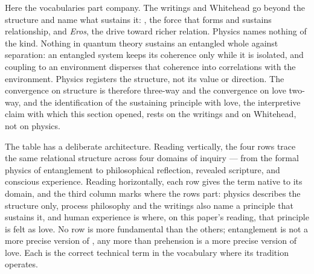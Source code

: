 Here the vocabularies part company.
The \bahai writings and Whitehead go beyond the structure and name what
sustains it: \mahabbat, the force that forms and sustains relationship,
and \emph{Eros}, the drive toward richer relation.
Physics names nothing of the kind.
Nothing in quantum theory sustains an entangled whole against separation:
an entangled system keeps its coherence only while it is isolated, and
coupling to an environment disperses that coherence into correlations
with the environment.
Physics registers the structure, not its value or direction.
The convergence on structure is therefore three-way and the convergence on
love two-way, and the identification of the sustaining principle with
love, the interpretive claim with which this section opened, rests on the
\bahai writings and on Whitehead, not on physics.

The table has a deliberate architecture.
Reading vertically, the four rows trace the same relational structure
across four domains of inquiry --- from the formal physics of
entanglement to philosophical reflection, revealed scripture, and
conscious experience.
Reading horizontally, each row gives the term native to its domain, and
the third column marks where the rows part: physics describes the
structure only, process philosophy and the \bahai writings also name a
principle that sustains it, and human experience is where, on this
paper's reading, that principle is felt as love.
No row is more fundamental than the others; entanglement is not
a more precise version of \mahabbat, any more than prehension is a more
precise version of love.
Each is the correct technical term in the vocabulary where its tradition
operates.

